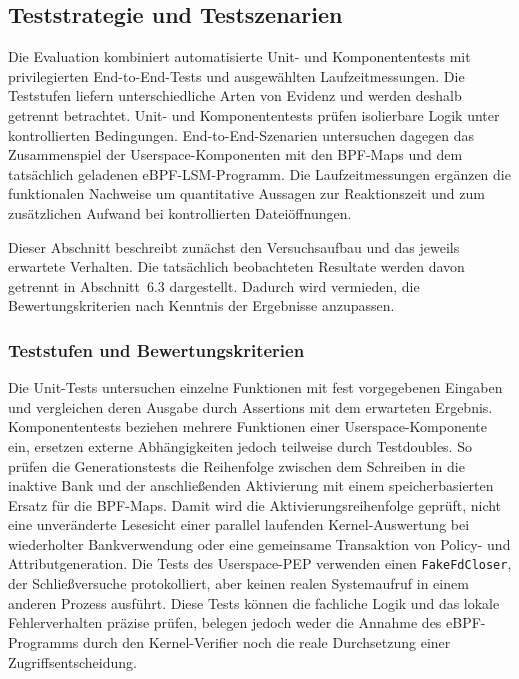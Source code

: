 \subsection{Teststrategie und Testszenarien}

Die Evaluation kombiniert automatisierte Unit- und Komponententests mit privilegierten
End-to-End-Tests und ausgewählten Laufzeitmessungen. Die Teststufen liefern unterschiedliche
Arten von Evidenz und werden deshalb getrennt betrachtet. Unit- und Komponententests prüfen
isolierbare Logik unter kontrollierten Bedingungen. End-to-End-Szenarien untersuchen dagegen das
Zusammenspiel der Userspace-Komponenten mit den BPF-Maps und dem tatsächlich geladenen
eBPF-LSM-Programm. Die Laufzeitmessungen ergänzen die funktionalen Nachweise um quantitative
Aussagen zur Reaktionszeit und zum zusätzlichen Aufwand bei kontrollierten Dateiöffnungen.

Dieser Abschnitt beschreibt zunächst den Versuchsaufbau und das jeweils erwartete Verhalten. Die
tatsächlich beobachteten Resultate werden davon getrennt in Abschnitt~6.3 dargestellt. Dadurch
wird vermieden, die Bewertungskriterien nach Kenntnis der Ergebnisse anzupassen.

\subsubsection{Teststufen und Bewertungskriterien}

Die Unit-Tests untersuchen einzelne Funktionen mit fest vorgegebenen Eingaben und vergleichen deren
Ausgabe durch Assertions mit dem erwarteten Ergebnis. Komponententests beziehen mehrere Funktionen
einer Userspace-Komponente ein, ersetzen externe Abhängigkeiten jedoch teilweise durch
Testdoubles. So prüfen die Generationstests die Reihenfolge zwischen dem Schreiben in die inaktive
Bank und der anschließenden Aktivierung mit einem speicherbasierten Ersatz für die BPF-Maps.
Damit wird die Aktivierungsreihenfolge geprüft, nicht eine unveränderte Lesesicht einer parallel laufenden Kernel-Auswertung bei wiederholter Bankverwendung oder eine gemeinsame Transaktion von Policy- und Attributgeneration.
Die Tests des Userspace-PEP verwenden einen
\texttt{FakeFdCloser}, der Schließversuche protokolliert, aber keinen realen Systemaufruf in einem
anderen Prozess ausführt. Diese Tests können die fachliche Logik und das lokale Fehlerverhalten
präzise prüfen, belegen jedoch weder die Annahme des eBPF-Programms durch den Kernel-Verifier noch
die reale Durchsetzung einer Zugriffsentscheidung.

